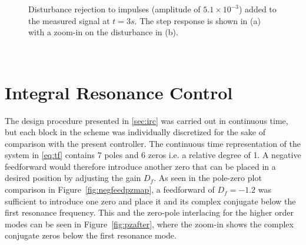 \begin{figure}[h!]
  \centering %
  \qquad
  \caption{\label{fig:distmeasrejection} Disturbance rejection to impulses (amplitude of $5.1 \times 10^{-3}$) added to the measured signal at $t=3s$. The step response is shown in (a)  with a zoom-in on the disturbance in (b).}
\end{figure}

\newpage~\newpage~
\FloatBarrier
\section{Integral Resonance Control}
The \abbrIRC design procedure presented in \ref{sec:irc} was carried out in continuous time, but each block in the scheme was individually discretized for the sake of comparison with the present controller. The continuous time representation of the system in \eqref{eq:tf} contains 7 poles and 6 zeros i.e. a relative degree of 1. A negative feedforward would therefore introduce another zero that can be placed in a desired position by adjusting the gain $D_f$. As seen in the pole-zero plot comparison in Figure~\ref{fig:negfeedpzmap}, a feedforward of $D_f=-1.2$ was sufficient to introduce one zero and place it and its complex conjugate below the first resonance frequency. This and the zero-pole interlacing for the higher order modes can be seen in Figure~\ref{fig:pzafter}, where the zoom-in shows the complex conjugate zeros below the first resonance mode.


